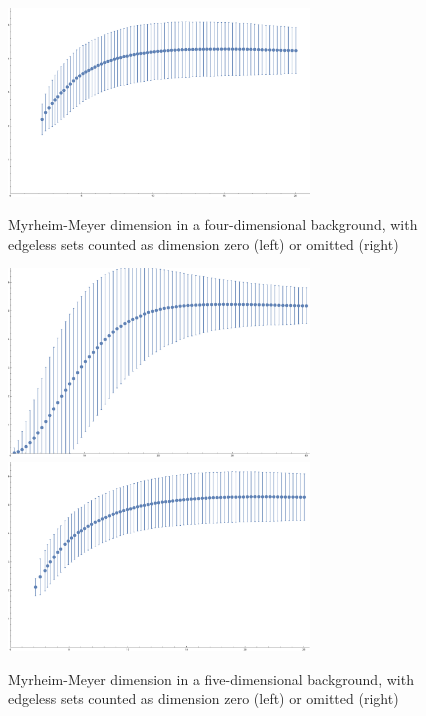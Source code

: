 \documentclass[12pt]{article}
\begin{document}
\begin{figure}
\begin{center}
 \includegraphics[width=3.15in]{CSDimRed2.pdf}
\caption{Myrheim-Meyer dimension in a four-dimensional background,
with edgeless sets counted as dimension zero (left) or omitted (right) \label{fig3}}
\end{center}
\begin{center}
\includegraphics[width=3.15in]{CSDimRed5D.pdf}
 \includegraphics[width=3.15in]{CSDimRed5D2.pdf}
\caption{Myrheim-Meyer dimension in a five-dimensional background,
with edgeless sets counted as dimension zero (left) or omitted (right) \label{fig4}}
\end{center}
\end{figure}

\newpage

\vspace{1.5ex}



\end{document}

